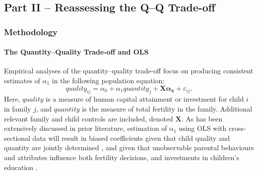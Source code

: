 \documentclass[subeqn]{article}
\begin{document}
\begin{spacing}{1.4}



\setcounter{section}{0}
\part*{Part II -- Reassessing the Q--Q Trade-off}
\section{Methodology}
\label{TWINscn:method}
\subsection{The Quantity--Quality Trade-off and OLS}
\label{sscn:OLS}
Empirical analyses of the quantity--quality trade-off focus on producing
consistent estimates of $\alpha_1$ in the following population equation:
\begin{equation}
  \label{TWINeqn:RF}
  quality_{ij}=\alpha_0+\alpha_1 quantity_{j} + \bm{X}\bm{\alpha_x}+\varepsilon_{ij}.
\end{equation}
Here, $quality$ is a measure of human capital attainment or investment for child
$i$ in family $j$, and $quantity$ is the measure of total fertility in the
family. Additional relevant family and child controls are included, denoted $\bm{X}$.
As has been extensively discussed in prior literature, estimation of $\alpha_1$
using OLS with cross-sectional data will result in biased coefficients given that
child quality and quantity are jointly determined \citep{BeckerLewis1973,
  BeckerTomes1976}, and given that unobservable parental behaviours and attributes
influence both fertility decisions, and investments in children's education
\citep{Qian2009}.


\end{spacing}
\end{document}
